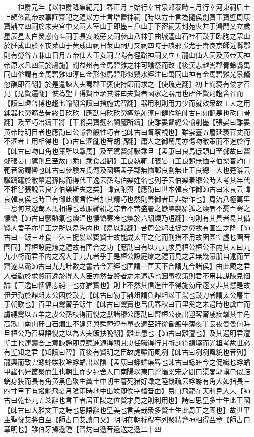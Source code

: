 　　神爵元年【以神爵降集紀元】春正月上始行幸甘泉郊泰畤三月行幸河東祠后土上頗修武帝故事謹齋祀之禮以方士言增置神祠【時以方士言為隨侯劍寶玉寶璧周康寶鼎立四祠於未央宫中又祠大室山于即墨三戶山于下密祠天封苑火井于鴻門又立歲星辰星太白熒惑南斗祠于長安城旁又祠參山八神于曲城蓬山石社石鼓于臨朐之罘山於腄成山於不夜莱山于黄成山祠日莱山祠月又祠四時于琅邪蚩尤于夀良京師近縣鄠則有勞谷五牀山日月五帝仙人玉女祠雲陽有徑路神祠又立五龍山仙人祠及黄帝天神帝原水凡四祠於膚施】聞益州有金馬碧雞之神可醮祭而致【後漢志越嶲郡青蛉縣禺同山俗謂有金馬碧雞如淳曰金形似馬碧形似鷄水經注曰禺同山神有金馬碧雞光景儵忽醮即召翻】於是遣諫大夫蜀郡王褒使持節而求之【使疏吏翻】初上聞褒有俊才召見【見賢遍翻】使為聖主得賢臣頌其辭曰夫賢者國家之器用也所任賢則趨舍省而【讀曰趣普博也趨七喻翻舍讀曰捨施式智翻】器用利則用力少而就效衆故工人之用鈍器也勞筋苦骨終日矻矻【應劭曰矻矻勞極貌如淳曰健作貌師古曰如說是也矻口骨翻】及至巧冶鑄干將【干將吳寶劒名闔廬所鑄】使離婁督繩公輸削墨【張晏曰離婁黄帝時明目者也應劭曰公輸魯般性巧者也師古曰督察視也】雖崇臺五層延袤百丈而不溷者工用相得也【師古曰溷亂也音胡頓翻】庸人之御駑馬亦傷吻敝策而不進於行【師古曰吻口角也策所以撃馬】及至駕齧厀驂乘旦【孟康曰良馬低頭口至䣛故曰齧䣛張晏曰駕則旦至故曰乘曰乘食證翻】王良執靶【張晏曰王良郵無恤字伯樂晉灼曰靶音霸謂轡也師古曰參驗左氏傳及國語孟子郵無恤郵良劉無止王良總一人也楚辭云驥躊躇於敝輦遇孫陽而得代王逸云孫陽伯樂姓名也列子云伯樂秦穆公時人考其年代不相當張說云良字伯樂斯失之矣】韓哀附輿【應劭曰世本韓哀作御師古曰宋衷云韓哀韓哀侯也時已有御此復言作者加其精巧也然則善御者耳非始作也】周流八極萬里一息何其遼哉人馬相得也故服絺綌之凉者不苦盛暑之鬱燠襲貂狐之煗者不憂至寒之悽愴【師古曰鬱熱氣也燠温也悽愴寒冷也燠於六翻煗乃短翻】何則有其具者易其備賢人君子亦聖王之所以易海内也【易以豉翻】昔周公躬吐捉之勞故有圉空之隆【師古曰一飯三吐食一沐三捉髪以賓賢士故能成太平之化而刑措不用故囹圄空虚也圉音圄同】齊桓設庭燎之禮故有匡合之功【應劭曰有以九九求見桓公桓公不内其人曰九九小術而君不内之况大于九九者乎于是桓公設庭燎之禮而見之居無幾隰朋自遠而至齊遂以霸師古曰九九計數之書若今筭經也匡謂一匡天下合謂九合諸侯】由此觀之君人者勤於求賢而逸於得人人臣亦然昔賢者之未遭遇也圖事揆策則君不用其謀陳見悃誠【王逸曰悃愊志純一也亦猶實也】則上不然其信進仕不得施効斥逐又非其愆是故伊尹勤於鼎俎太公困於鼔刀【師古曰勒于鼎俎謂負鼎俎以干湯也鼓刀者謂太公屠牛于朝歌也】百里自鬻甯子飯牛【師古曰鬻賣也呂氏春秋曰百里奚之未遇時也虞亡而虜縛鬻以五羊之皮公孫枝得而悅之獻諸穆公應劭曰齊桓公夜出迎客甯戚疾擊其牛角高歌曰南山矸白石爛生不逢堯與舜禪短布單衣適至骭從昏飯牛薄夜半長夜曼曼何時旦桓公乃召與語悅之以為大夫飯扶晚翻】離此患也【師古曰離遭也】及其遇明君遭聖主也運籌合上意諫諍即見聽進退得關其忠任職得行其術剖符錫壤而光祖考故世必有聖知之君【知讀曰智】而後有賢明之臣故虎嘯而風冽【師古曰冽冽風貌也音列】龍興而致雲蟋蟀竢秋唫蜉蝤出以隂【孟康曰蜉蝤渠畧也師古曰蟋蟀今之促織也蜉蝤甲蟲也好叢聚而生也朝生而夕死舍人曰南陽以東曰蜉蝤梁宋之間曰渠畧郭璞曰似蛣蜣身狹而長有角黄黑色聚生糞土中朝生暮死猪好噉之陸機疏云蜉蝣有角大如指長三四寸甲下有翅能飛夏月隂雨時地中出竢即俟字蝤音由】易曰飛龍在天利見大人【師古曰乾卦九五爻辭也言王者居正陽之位賢才見之則利用也】詩曰思皇多士生此王國【師古曰大雅文王之詩也思語辭也皇美也言美哉衆多賢士生此周王之國也】故世平主聖俊艾將自至【師古曰艾讀曰乂】明明在朝穆穆布列聚精會神相得益章【師古曰章明也】雖伯牙操遞鍾【晉灼曰遞音遞送之遞二十四